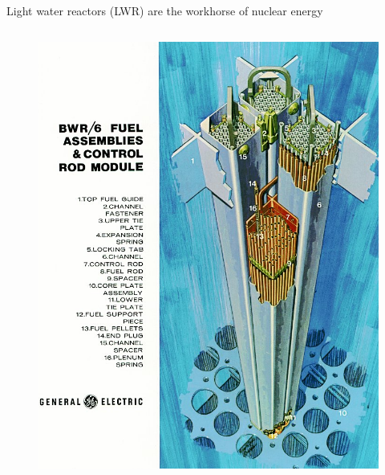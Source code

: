 \documentclass{beamer}
\begin{document}
    \begin{frame}{Light water reactors (LWR) are the workhorse of nuclear energy}

        \begin{columns}[T]

            \begin{column}{0.5\textwidth}
                \begin{figure}
                    \centering
                    \includegraphics[width=1.0\textwidth]{./img/bwrFuel.png}
                    \caption*{}
                \end{figure}
            \end{column}


\end{columns}
\end{frame}
\end{document}
